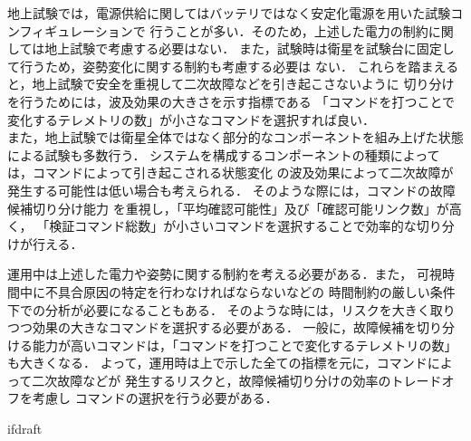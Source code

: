 \documentclass[11pt]{jsreport}
\begin{document}
地上試験では，電源供給に関してはバッテリではなく安定化電源を用いた試験コンフィギュレーションで
行うことが多い．そのため，上述した電力の制約に関しては地上試験で考慮する必要はない．
また，試験時は衛星を試験台に固定して行うため，姿勢変化に関する制約も考慮する必要は
ない．
これらを踏まえると，地上試験で安全を重視して二次故障などを引き起こさないように
切り分けを行うためには，波及効果の大きさを示す指標である
「コマンドを打つことで変化するテレメトリの数」が小さなコマンドを選択すれば良い．\\
また，地上試験では衛星全体ではなく部分的なコンポーネントを組み上げた状態による試験も多数行う．
システムを構成するコンポーネントの種類によっては，コマンドによって引き起こされる状態変化
の波及効果によって二次故障が発生する可能性は低い場合も考えられる．
そのような際には，コマンドの故障候補切り分け能力
を重視し，「平均確認可能性」及び「確認可能リンク数」が高く，
「検証コマンド総数」が小さいコマンドを選択することで効率的な切り分けが行える．

運用中は上述した電力や姿勢に関する制約を考える必要がある．また，
可視時間中に不具合原因の特定を行わなければならないなどの
時間制約の厳しい条件下での分析が必要になることもある．
そのような時には，リスクを大きく取りつつ効果の大きなコマンドを選択する必要がある．
一般に，故障候補を切り分ける能力が高いコマンドは，「コマンドを打つことで変化するテレメトリの数」
も大きくなる．
よって，運用時は上で示した全ての指標を元に，コマンドによって二次故障などが
発生するリスクと，故障候補切り分けの効率のトレードオフを考慮し
コマンドの選択を行う必要がある．


\expandafter\ifx\csname ifdraft\endcsname\relax
  
\end{document}
